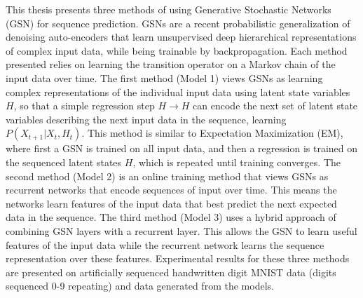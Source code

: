 This thesis presents three methods of using Generative Stochastic Networks (GSN) for sequence prediction. GSNs are a recent probabilistic generalization of denoising auto-encoders that learn unsupervised deep hierarchical representations of complex input data, while being trainable by backpropagation. Each method presented relies on learning the transition operator on a Markov chain of the input data over time. The first method (Model 1) views GSNs as learning complex representations of the individual input data using latent state variables \(H\), so that a simple regression step \(H \rightarrow H\) can encode the next set of latent state variables describing the next input data in the sequence, learning \(P(X_{t+1}|X_t, H_t)\). This method is similar to Expectation Maximization (EM), where first a GSN is trained on all input data, and then a regression is trained on the sequenced latent states \(H\), which is repeated until training converges. The second method (Model 2) is an online training method that views GSNs as recurrent networks that encode sequences of input over time. This means the networks learn features of the input data that best predict the next expected data in the sequence. The third method (Model 3) uses a hybrid approach of combining GSN layers with a recurrent layer. This allows the GSN to learn useful features of the input data while the recurrent network learns the sequence representation over these features. Experimental results for these three methods are presented on artificially sequenced handwritten digit MNIST data (digits sequenced 0-9 repeating) and data generated from the models.